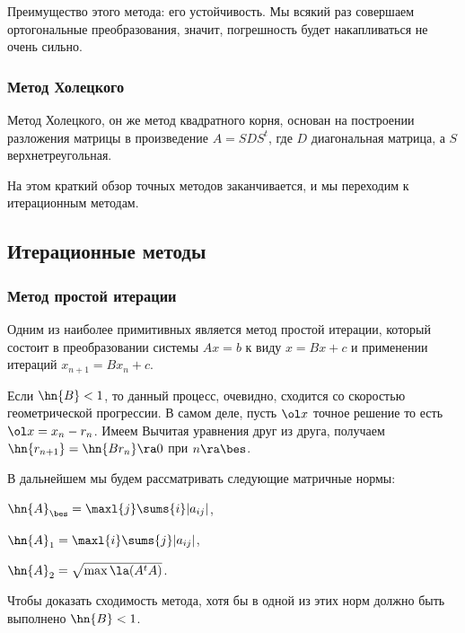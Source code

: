 \documentclass[a4paper]{article}
\begin{document}
Преимущество этого метода: его устойчивость. Мы всякий раз совершаем
ортогональные преобразования, значит, погрешность будет накапливаться
не очень сильно.

\subsubsection{Метод Холецкого}

Метод Холецкого, он же метод квадратного корня, основан на построении
разложения матрицы в произведение $A = S D S^t$, где $D$ диагональная
матрица, а $S$ верхнетреугольная.


На этом краткий обзор точных методов заканчивается, и мы переходим к
итерационным методам.

\subsection{Итерационные методы}

\subsubsection{Метод простой итерации}

Одним из наиболее примитивных является метод простой итерации, который
состоит в преобразовании системы $Ax=b$ к виду $x = Bx +c$ и
применении итераций $x_{n+1} = Bx_n+c$.

Если $\hn{B} <1$, то данный процесс, очевидно, сходится со скоростью
геометрической прогрессии. В самом деле, пусть $\ol x$ точное решение
то есть $\ol x = x_n -r_n$. Имеем   Вычитая уравнения друг из друга,
получаем $\hn{r_{n+1}} = \hn{B r_n} \ra 0$ при $n\ra \bes$.


В дальнейшем мы будем рассматривать следующие матричные нормы:
\begin{items}{-2}
\item $\hn{A}_\bes = \maxl{j}\sums{i}|a_{ij}|$,
\item $\hn{A}_1 = \maxl{i}\sums{j}|a_{ij}|$,
\item $\hn{A}_2 = \sqrt{\max \la(A^tA)}$.
\end{items}

Чтобы доказать сходимость метода, хотя бы в одной из этих норм должно
быть выполнено $\hn{B} < 1$.
\end{document}

